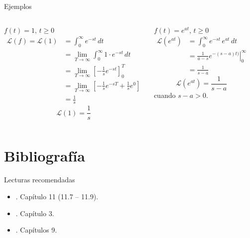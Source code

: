 \documentclass[9pt, aspectratio=169]{beamer}
\begin{document}
\begin{frame}{Ejemplos}
\begin{columns}[t]
\cx
$f(t) = 1, \, t \geq 0$
\begin{align*}
    \mathscr{L}(f) = \mathscr{L}(1) &= \int_0^{\infty} e^{-st} \, dt \\
&= \lim_{T \rightarrow \infty} \int_0^{\infty} 1 \cdot e^{-s t} \, dt \\
&= \lim_{T \rightarrow \infty} \left[ -\frac{1}{s} e^{-s t} \right]_0^T \\
&= \lim_{T \rightarrow \infty} \left[ -\frac{1}{s} e^{-s T} + \frac{1}{s} e^0 \right] \\
&= \frac{1}{s}
\end{align*}
\[ \boxed{ \mathscr{L}(1) = \frac{1}{s} } \]
\pause
 
\cx
$f(t) = e^{at}, \, t \geq 0$
\begin{align*}
    \mathscr{L} (e^{at}) &= \int_0^{\infty} e^{-st} \, e^{at} \, dt \\
                         &= \left. \frac{1}{a - s} e^{-(s-a)t)} \right|_0^{\infty} \\
                         &= \frac{1}{s -a}
\end{align*}
\[ \boxed{ \mathscr{L}(e^{at}) = \frac{1}{s -a}} \]
cuando $s -a > 0$.
\end{columns}

\end{frame}


\section*{Bibliografía}
\begin{frame}[allowframebreaks]{Lecturas recomendadas}
\begin{itemize}
 \item {}. Capítulo 11 (11.7 -- 11.9).
 \item {}. Capítulo 3.
 \item {}. Capítulos 9.
\end{itemize}
\end{frame}
\end{document}
